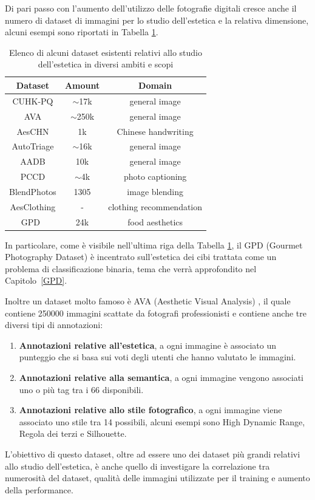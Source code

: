 Di pari passo con l'aumento dell'utilizzo delle fotografie digitali cresce anche il numero di dataset di immagini per lo studio dell'estetica e la relativa dimensione, alcuni esempi sono riportati in Tabella \ref{tabella_dataset}.
\begin{table}[H]
\centering
\begin{tabular}{| c | c | c |}
\hline
Dataset & Amount & Domain\\ [0.5ex]
\hline
CUHK-PQ\cite{luo2011content} & $\sim$17k & general image \\
AVA\cite{murray2012ava} & $\sim$250k & general image \\
AesCHN\cite{sun2015aesthetic} & 1k & Chinese handwriting \\
AutoTriage\cite{chang2016automatic} & $\sim$16k & general image \\
AADB\cite{kong2016photo} & 10k & general image \\
PCCD\cite{chang2017aesthetic} & $\sim$4k & photo captioning \\
BlendPhotos\cite{hung2018learning} & 1305 & image blending \\
AesClothing\cite{yu2018aesthetic} & - & clothing recommendation\\
\hline
GPD\cite{sheng2021learning}\ & 24k & food aesthetics \\ [1ex]
\hline 
\end{tabular}
\caption{Elenco di alcuni dataset esistenti relativi allo studio dell'estetica in diversi ambiti e scopi}
\label{tabella_dataset}
\end{table}

In particolare, come è visibile nell'ultima riga della Tabella \ref{tabella_dataset}, il GPD (Gourmet Photography Dataset) \cite{sheng2021learning} è incentrato sull'estetica dei cibi trattata come un problema di classificazione binaria, tema che verrà approfondito nel Capitolo~\ref{GPD}.

Inoltre un dataset molto famoso è AVA (Aesthetic Visual Analysis) \cite{murray2012ava}, il quale contiene 250000 immagini scattate da fotografi professionisti e contiene anche tre diversi tipi di annotazioni:
\begin{enumerate}
\item \textbf{Annotazioni relative all'estetica}, a ogni immagine è associato un punteggio che si basa sui voti degli utenti che hanno valutato le immagini.
\item \textbf{Annotazioni relative alla semantica}, a ogni immagine vengono associati uno o più tag tra i 66 disponibili.
\item \textbf{Annotazioni relative allo stile fotografico}, a ogni immagine viene associato uno stile tra 14 possibili, alcuni esempi sono High Dynamic Range, Regola dei terzi e Silhouette.
\end{enumerate}
L'obiettivo di questo dataset, oltre ad essere uno dei dataset più grandi relativi allo studio dell'estetica, è anche quello di investigare la correlazione tra numerosità del dataset, qualità delle immagini utilizzate per il training e aumento della performance.


